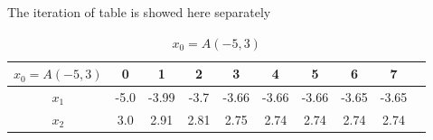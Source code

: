The iteration of table is showed here separately
\begin{table}[H]
\centering
\setlength{\abovecaptionskip}{0cm} 
\setlength{\belowcaptionskip}{-0.5cm} 
\scriptsize
\begin{tabular}{|c|c|c|c|c|c|c|c|c|c|}
\hline
$x_0=A(-5,3)$&0&1&2&3&4&5&6&7\\
\hline
$x_1$&-5.0 & -3.99 & -3.7 & -3.66 & -3.66 & -3.66 & -3.65 & -3.65 \\
\hline
$x_2$&3.0 & 2.91 & 2.81 & 2.75 & 2.74 & 2.74 & 2.74 & 2.74
\\
\hline
\end{tabular}
\caption{$x_0=A(-5,3)$}
\end{table}


